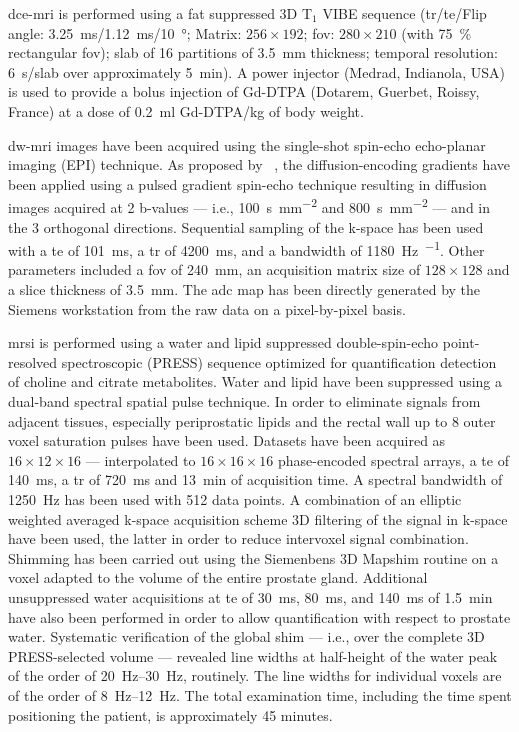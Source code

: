 \ac{dce}-\ac{mri} is performed using a fat suppressed 3D T$_1$ VIBE sequence (\ac{tr}/\ac{te}/Flip angle: \SI{3.25}{\ms}/\SI{1.12}{\ms}/\SI{10}{\degree}; Matrix: $256 \times 192$; \ac{fov}: $280 \times 210$ (with \SI{75}{\percent} rectangular \ac{fov}); slab of 16 partitions of \SI{3.5}{\mm} thickness; temporal resolution: \SI{6}{\s}/slab over approximately \SI{5}{\minute}).
A power injector (Medrad, Indianola, USA) is used to provide a bolus injection of Gd-DTPA (Dotarem, Guerbet, Roissy, France) at a dose of \SI{0.2}{\ml} Gd-DTPA/kg of body weight.

\ac{dw}-\ac{mri} images have been acquired using the single-shot spin-echo echo-planar imaging (EPI) technique.
As proposed by \citeauthor{stejskal1965spin}~\cite{stejskal1965spin}, the diffusion-encoding gradients have been applied using a pulsed gradient spin-echo technique resulting in diffusion images acquired at 2 b-values --- i.e., \SI{100}{\second\per\milli\meter\squared} and \SI{800}{\second\per\milli\meter\squared} --- and in the 3 orthogonal directions.
Sequential sampling of the k-space has been used with a \ac{te} of \SI{101}{\ms}, a \ac{tr} of \SI{4200}{\ms}, and a bandwidth of \SI{1180}{\hertz\per\px}.
Other parameters included a \ac{fov} of \SI{240}{\milli\metre}, an acquisition matrix size of $128 \times 128$ and a slice thickness of \SI{3.5}{\milli\metre}.
The \ac{adc} map has been directly generated by the Siemens workstation from the raw data on a pixel-by-pixel basis.

\ac{mrsi} is performed using a water and lipid suppressed double-spin-echo point-resolved spectroscopic (PRESS) sequence optimized for quantification detection of choline and citrate metabolites.
Water and lipid have been suppressed using a dual-band spectral spatial pulse technique.
In order to eliminate signals from adjacent tissues, especially periprostatic lipids and the rectal wall up to 8 outer voxel saturation pulses have been used.
Datasets have been acquired as $16 \times 12 \times 16$ --- interpolated to $16 \times 16 \times 16$ phase-encoded spectral arrays, a \ac{te} of \SI{140}{\ms}, a \ac{tr} of \SI{720}{\ms} and \SI{13}{\minute} of acquisition time.
A spectral bandwidth of \SI{1250}{\hertz} has been used with 512 data points.
A combination of an elliptic weighted averaged k-space acquisition scheme 3D filtering of the signal in k-space have been used, the latter in order to reduce intervoxel signal combination.
Shimming has been carried out using the Siemenbens 3D Mapshim routine on a voxel adapted to the volume of the entire prostate gland.
Additional unsuppressed water acquisitions at \ac{te} of \SI{30}{\ms}, \SI{80}{\ms}, and \SI{140}{\ms} of \SI{1.5}{\minute} have also been performed in order to allow quantification with respect to prostate water.
Systematic verification of the global shim --- i.e., over the complete 3D PRESS-selected volume --- revealed line widths at half-height of the water peak of the order of \SIrange{20}{30}{\hertz}, routinely.
The line widths for individual voxels are of the order of \SIrange{8}{12}{\hertz}.
The total examination time, including the time spent positioning the patient, is approximately 45 minutes.


